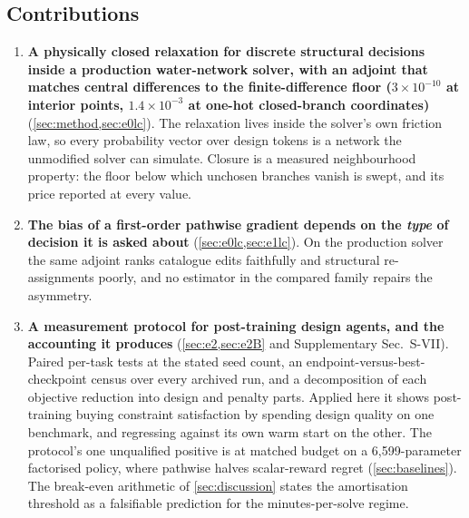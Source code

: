 \subsection{Contributions}
\label{sec:contributions}

\begin{enumerate}

\item \textbf{A physically closed relaxation for discrete structural decisions
  inside a production water-network solver, with an adjoint that matches central
  differences to the finite-difference floor ($3\times10^{-10}$ at interior points,
  $1.4\times10^{-3}$ at one-hot closed-branch coordinates)}
  (\cref{sec:method,sec:e0lc}).  The relaxation lives inside the solver's own
  friction law, so every probability vector over design tokens is a network the
  unmodified solver can simulate.  Closure is a measured neighbourhood property:
  the floor below which unchosen branches vanish is swept, and its price
  reported at every value.

\item \textbf{The bias of a first-order pathwise gradient depends on the
  \emph{type} of decision it is asked about} (\cref{sec:e0lc,sec:e1lc}).  On
  the production solver the same adjoint ranks catalogue edits faithfully and
  structural re-assignments poorly, and no estimator in the compared family
  repairs the asymmetry.

\item \textbf{A measurement protocol for post-training design agents, and the
  accounting it produces} (\cref{sec:e2,sec:e2B} and Supplementary Sec.~S-VII).  Paired per-task
  tests at the stated seed count, an endpoint-versus-best-checkpoint census over
  every archived run, and a decomposition of each objective reduction into
  design and penalty parts.  Applied here it shows post-training buying
  constraint satisfaction by spending design quality on one benchmark, and
  regressing against its own warm start on the other.  The protocol's one
  unqualified positive is at matched budget on a 6{,}599-parameter factorised
  policy, where pathwise halves scalar-reward regret (\cref{sec:baselines}).
  The break-even arithmetic of \cref{sec:discussion} states the amortisation
  threshold as a falsifiable prediction for the minutes-per-solve regime.


\end{enumerate}
